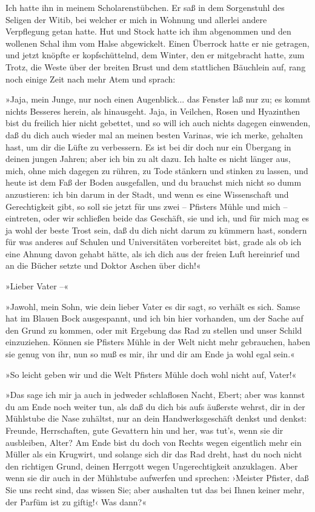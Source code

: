 Ich hatte ihn in meinem Scholarenstübchen. Er saß in dem
Sorgenstuhl des Seligen der Witib, bei welcher er mich in Wohnung
und allerlei andere Verpflegung getan hatte. Hut und Stock hatte
ich ihm abgenommen und den wollenen Schal ihm vom Halse
abgewickelt. Einen Überrock hatte er nie getragen, und jetzt
knöpfte er kopfschüttelnd, dem Winter, den er mitgebracht hatte,
zum Trotz, die Weste über der breiten Brust und dem stattlichen
Bäuchlein auf, rang noch einige Zeit nach mehr Atem und sprach:

»Jaja, mein Junge, nur noch einen Augenblick... das Fenster laß nur
zu; es kommt nichts Besseres herein, als hinausgeht. Jaja, in
Veilchen, Rosen und Hyazinthen bist du freilich hier nicht
gebettet, und so will ich auch nichts dagegen einwenden, daß du
dich auch wieder mal an meinen besten Varinas, wie ich merke,
gehalten hast, um dir die Lüfte zu verbessern. Es ist bei dir doch
nur ein Übergang in deinen jungen Jahren; aber ich bin zu alt dazu.
Ich halte es nicht länger aus, mich, ohne mich dagegen zu rühren,
zu Tode stänkern und stinken zu lassen, und heute ist dem Faß der
Boden ausgefallen, und du brauchst mich nicht so dumm anzustieren:
ich bin darum in der Stadt, und wenn es eine Wissenschaft und
Gerechtigkeit gibt, so soll sie jetzt für uns zwei – Pfisters Mühle
und mich – eintreten, oder wir schließen beide das Geschäft, sie
und ich, und für mich mag es ja wohl der beste Trost sein, daß du
dich nicht darum zu kümmern hast, sondern für was anderes auf
Schulen und Universitäten vorbereitet bist, grade als ob ich eine
Ahnung davon gehabt hätte, als ich dich aus der freien Luft
hereinrief und an die Bücher setzte und Doktor Aschen über dich!«

»Lieber Vater –«

»Jawohl, mein Sohn, wie dein lieber Vater es dir sagt, so verhält
es sich. Samse hat im Blauen Bock ausgespannt, und ich bin hier
vorhanden, um der Sache auf den Grund zu kommen, oder mit Ergebung
das Rad zu stellen und unser Schild einzuziehen. Können sie
Pfisters Mühle in der Welt nicht mehr gebrauchen, haben sie genug
von ihr, nun so muß es mir, ihr und dir am Ende ja wohl egal
sein.«

»So leicht geben wir und die Welt Pfisters Mühle doch wohl nicht
auf, Vater!«

»Das sage ich mir ja auch in jedweder schlaflosen Nacht, Ebert;
aber was kannst du am Ende noch weiter tun, als daß du dich bis
aufs äußerste wehrst, dir in der Mühlstube die Nase zuhältst, nur
an dein Handwerksgeschäft denkst und denkst: Freunde, Herrschaften,
gute Gevattern hin und her, was tut's, wenn sie dir ausbleiben,
Alter? Am Ende bist du doch von Rechts wegen eigentlich mehr ein
Müller als ein Krugwirt, und solange sich dir das Rad dreht, hast
du noch nicht den richtigen Grund, deinen Herrgott wegen
Ungerechtigkeit anzuklagen. Aber wenn sie dir auch in der Mühlstube
aufwerfen und sprechen: ›Meister Pfister, daß Sie uns recht sind,
das wissen Sie; aber aushalten tut das bei Ihnen keiner mehr, der
Parfüm ist zu giftig!‹ Was dann?«

